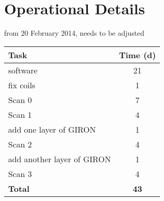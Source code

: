 \section{Operational Details}


from 20 February 2014, needs to be adjusted

\begin{table}[h]
\centering
\begin{tabular}{lc}
\toprule
Task & Time (d)\\
\midrule
software & 21\\
fix coils & 1\\
Scan 0 & 7 \\
Scan 1 & 4 \\
add one layer of GIRON & 1\\
Scan 2 & 4\\
add another layer of GIRON & 1\\
Scan 3 & 4\\
\midrule
{\bf Total} & {\bf 43}\\
\bottomrule
\end{tabular}
\label{tab:schedule}
\end{table}

